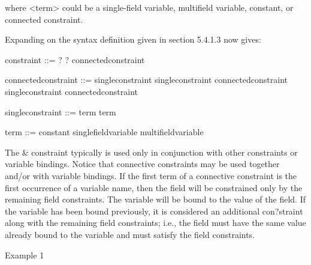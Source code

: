 \documentclass[letterpaper,10pt,english]{sphinxmanual}
\begin{document}
where \textless{}term\textgreater{} could be a single-field variable, multifield variable,
constant, or connected constraint.

Expanding on the syntax definition given in section 5.4.1.3 now gives:


\begin{sphinxVerbatim}[commandchars=\\\{\}]
\PYGZlt{}constraint\PYGZgt{} ::= ? \textbar{} \PYGZdl{}? \textbar{} \PYGZlt{}connected\PYGZhy{}constraint\PYGZgt{}

\PYGZlt{}connected\PYGZhy{}constraint\PYGZgt{} ::= \PYGZlt{}single\PYGZhy{}constraint\PYGZgt{} \textbar{}
  \PYGZlt{}single\PYGZhy{}constraint\PYGZgt{} \PYGZam{} \PYGZlt{}connected\PYGZhy{}constraint\PYGZgt{} \textbar{}
  \PYGZlt{}single\PYGZhy{}constraint\PYGZgt{} \textbar{} \PYGZlt{}connected\PYGZhy{}constraint\PYGZgt{}

\PYGZlt{}single\PYGZhy{}constraint\PYGZgt{} ::= \PYGZlt{}term\PYGZgt{} \textbar{} \PYGZti{}\PYGZlt{}term\PYGZgt{}

\PYGZlt{}term\PYGZgt{} ::= \PYGZlt{}constant\PYGZgt{} \textbar{} \PYGZlt{}single\PYGZhy{}field\PYGZhy{}variable\PYGZgt{} \textbar{} \PYGZlt{}multifield\PYGZhy{}variable\PYGZgt{}
\end{sphinxVerbatim}

The \& constraint typically is used only in conjunction with other
constraints or variable bindings. Notice that connective constraints may
be used together and/or with variable bindings. If the first term of a
connective constraint is the first occurrence of a variable name, then
the field will be constrained only by the remaining field constraints.
The variable will be bound to the value of the field. If the variable
has been bound previously, it is considered an additional con?straint
along with the remaining field constraints; i.e., the field must have
the same value already bound to the variable and must satisfy the field
constraints.

Example 1
\end{document}
